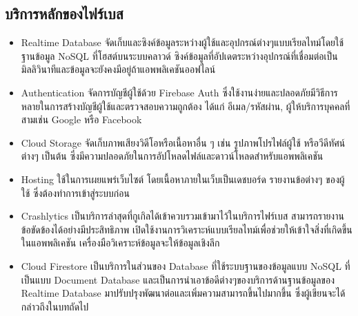 \subsection{บริการหลักของไฟร์เบส}
\begin{itemize}
	\item Realtime Database จัดเก็บและซิงค์ข้อมูลระหว่างผู้ใช้และอุปกรณ์ต่างๆแบบเรียลไทม์โดยใช้ฐานข้อมูล NoSQL ที่โฮสต์บนระบบคลาวด์ ซิงค์ข้อมูลที่อัปเดตระหว่างอุปกรณ์ที่เชื่อมต่อเป็นมิลลิวินาทีและข้อมูลจะยังคงมีอยู่ถ้าแอพพลิเคชันออฟไลน์
	\item Authentication จัดการบัญชีผู้ใช้ด้วย Firebase Auth ซึ่งใช้งานง่ายและปลอดภัยมีวิธีการหลายในการสร้างบัญชีผู้ใช้และตรวจสอบความถูกต้อง ได้แก่ อีเมล/รหัสผ่าน, ผู้ให้บริการบุคคลที่สามเช่น Google หรือ Facebook 
	\item Cloud Storage จัดเก็บภาพเสียงวิดีโอหรือเนื้อหาอื่น ๆ เช่น รูปภาพโปรไฟล์ผู้ใช้ หรือวีดีทัศน์ต่างๆ เป็นต้น ซึ่งมีความปลอดภัยในการอัปโหลดไฟล์และดาวน์โหลดสำหรับแอพพลิเคชัน
	\item Hosting ใช้ในการเผยแพร่เว็บไซต์  โดยเนื้อหาภายในเว็บเป็นเดชบอร์ด รายงานข้อต่างๆ ของผู้ใช้ ซึ่งต้องทำการเข้าสู่ระบบก่อน
	\item Crashlytics เป็นบริการล่าสุดที่กูเกิลได้เข้าควบรวมเข้ามาไว้ในบริการไฟร์เบส สามารถรายงานข้อขัดข้องได้อย่างมีประสิทธิภาพ เปิดใช้งานการวิเคราะห์แบบเรียลไทม์เพื่อช่วยให้เข้าใจสิ่งที่เกิดขึ้นในแอพพลิเคชัน เครื่องมือวิเคราะห์ข้อมูลจะให้ข้อมูลเชิงลึก
	\item Cloud Firestore เป็นบริการในส่วนของ Database ที่ใช้ระบบฐานของข้อมูลแบบ NoSQL ที่เป็นแบบ Document Database และเป็นการนำเอาข้อดีต่างๆของบริการด้านฐานข้อมูลของ Realtime Database มาปรับปรุงพัฒนาต่อและเพิ่มความสามารถขึ้นไปมากขึ้น ซึ่งผู้เขียนจะได้กล่าวถึงในบทถัดไป
\end{itemize}

